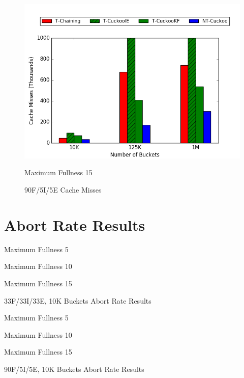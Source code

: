 \begin{figure}[H]
\begin{minipage}{.5\textwidth}
        \includegraphics[width=\linewidth]{maps/9015cm.png}
        \caption*{Maximum Fullness 15}
    \end{minipage}
    \caption{90F/5I/5E Cache Misses}
\end{figure}

\section{Abort Rate Results}

\begin{table}[H]
    \centering
    \begin{minipage}{.45\textwidth}
    \centering
        
        \caption*{Maximum Fullness 5}
    \end{minipage}
    \begin{minipage}{.45\textwidth}
    \centering
        
        \caption*{Maximum Fullness 10}
    \end{minipage}
    \begin{minipage}{.45\textwidth}
    \centering
        
        \caption*{Maximum Fullness 15}
    \end{minipage}
    \caption{33F/33I/33E, 10K Buckets Abort Rate Results}
\end{table}

\begin{table}[H]
    \centering
    \begin{minipage}{.45\textwidth}
    \centering
        
        \caption*{Maximum Fullness 5}
    \end{minipage}
    \begin{minipage}{.45\textwidth}
    \centering
        
        \caption*{Maximum Fullness 10}
    \end{minipage}
    \begin{minipage}{.45\textwidth}
    \centering
        
        \caption*{Maximum Fullness 15}
    \end{minipage}
    \caption{90F/5I/5E, 10K Buckets Abort Rate Results}
\end{table}

